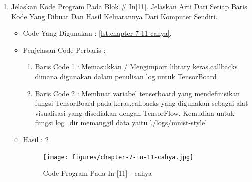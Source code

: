 \begin{enumerate}
\begin{itemize}
\par
\item Hasil : \ref{chapter-7-in-10-cahya}
\par
\par
\begin{figure}[!hbtp]
\centering
\texttt{[image: figures/chapter-7-in-10-cahya.jpg]}
\caption{Code Program Pada In [10] - cahya}
\label{chapter-7-in-10-cahya}
\end{figure}
\par
\par
\end{itemize}
\par
\par
\par
\item Jelaskan Kode Program Pada Blok \# In[11]. Jelaskan Arti Dari Setiap Baris Kode Yang Dibuat Dan Hasil Keluarannya Dari Komputer Sendiri.
\begin{itemize}
\item Code Yang Digunakan : \ref{lst:chapter-7-11-cahya}.

\par
\par
\item Penjelasan Code Perbaris	: 
\begin{enumerate}
\item Baris Code 1	: Memasukkan / Mengimport library keras.callbacks dimana digunakan dalam penulisan log untuk TensorBoard
\item Baris Code 2	: Membuat variabel tenserboard yang mendefinisikan fungsi TensorBoard pada keras.callbacks yang digunakan sebagai alat visualisasi yang disediakan dengan TensorFlow. Kemudian untuk fungsi log\_dir memanggil data yaitu './logs/mnist-style'
\end{enumerate}
\par
\item Hasil : \ref{chapter-7-in-11-cahya}
\par
\par
\begin{figure}[!hbtp]
\centering
\texttt{[image: figures/chapter-7-in-11-cahya.jpg]}
\caption{Code Program Pada In [11] - cahya}
\label{chapter-7-in-11-cahya}
\end{figure}
\par
\par
\end{itemize}
\par

\end{enumerate}
